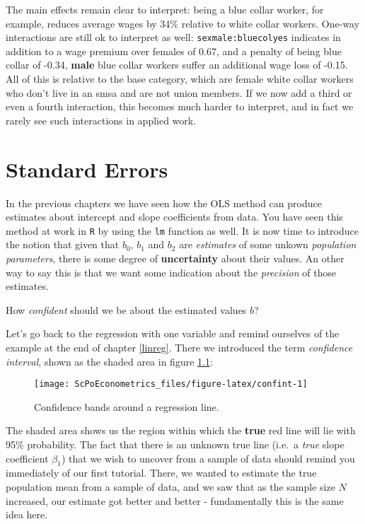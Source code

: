 \documentclass[]{book}
\newenvironment{note}{\begin{tcolorbox}[colback=blue!5!white,colframe=blue!75!black]}{\end{tcolorbox}}
\begin{document}
The main effects remain clear to interpret: being a blue collar worker,
for example, reduces average wages by 34\% relative to white collar
workers. One-way interactions are still ok to interpret as well:
\texttt{sexmale:bluecolyes} indicates in addition to a wage premium over
females of 0.67, and a penalty of being blue collar of -0.34,
\textbf{male} blue collar workers suffer an additional wage loss of
-0.15. All of this is relative to the base category, which are female
white collar workers who don't live in an smsa and are not union
members. If we now add a third or even a fourth interaction, this
becomes much harder to interpret, and in fact we rarely see such
interactions in applied work.

\chapter{Standard Errors}\label{std-errors}

In the previous chapters we have seen how the OLS method can produce
estimates about intercept and slope coefficients from data. You have
seen this method at work in \texttt{R} by using the \texttt{lm} function
as well. It is now time to introduce the notion that given that \(b_0\),
\(b_1\) and \(b_2\) are \emph{estimates} of some unkown \emph{population
parameters}, there is some degree of \textbf{uncertainty} about their
values. An other way to say this is that we want some indication about
the \emph{precision} of those estimates.

\begin{note}
How \emph{confident} should we be about the estimated values \(b\)?
\end{note}

 Let's go back to the regression with one variable and remind ourselves
of the example at the end of chapter \ref{linreg}. There we introduced
the term \emph{confidence interval}, shown as the shaded area in figure
\ref{fig:confint}:

\begin{figure}

{\centering \texttt{[image: ScPoEconometrics\_files/figure-latex/confint-1]} 

}

\caption{Confidence bands around a regression line.}\label{fig:confint}
\end{figure}

The shaded area shows us the region within which the \textbf{true} red
line will lie with 95\% probability. The fact that there is an unknown
true line (i.e.~a \emph{true} slope coefficient \(\beta_1\)) that we
wish to uncover from a sample of data should remind you immediately of
our first tutorial. There, we wanted to estimate the true population
mean from a sample of data, and we saw that as the sample size \(N\)
increased, our estimate got better and better - fundamentally this is
the same idea here.
\end{document}
